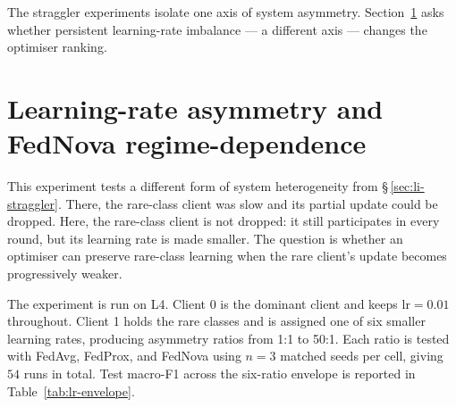\documentclass[11pt,a4paper]{report}
\begin{document}
The straggler experiments isolate one axis of system asymmetry.
Section~\ref{sec:lr-asymmetry} asks whether persistent learning-rate
imbalance --- a different axis --- changes the optimiser ranking.




\section{Learning-rate asymmetry and FedNova regime-dependence}
\label{sec:lr-asymmetry}

This experiment tests a different form of system heterogeneity from
\S\,\ref{sec:li-straggler}. There, the rare-class client was slow and its
partial update could be dropped. Here, the rare-class client is not dropped:
it still participates in every round, but its learning rate is made smaller.
The question is whether an optimiser can preserve rare-class learning when
the rare client's update becomes progressively weaker.

The experiment is run on L4. Client 0 is the dominant client and keeps
$\textrm{lr}=0.01$ throughout. Client 1 holds the rare classes and is assigned
one of six smaller learning rates, producing asymmetry ratios from 1:1 to
50:1. Each ratio is tested with FedAvg, FedProx, and FedNova using $n=3$
matched seeds per cell, giving $54$ runs in total. Test macro-F1 across the
six-ratio envelope is reported in Table~\ref{tab:lr-envelope}.
\end{document}
